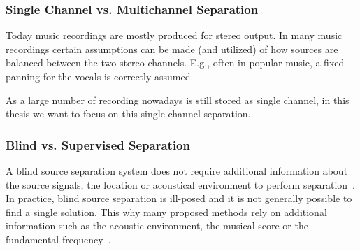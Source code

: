 \subsubsection*{Single Channel vs. Multichannel Separation}
Today music recordings are mostly produced for stereo output. 
In many music recordings certain assumptions can be made (and utilized) of how sources are balanced between the two stereo channels. 
E.g., often in popular music, a fixed panning for the vocals is correctly assumed.
\par
As a large number of recording nowadays is still stored as single channel, in this thesis we want to focus on this single channel separation.

\subsubsection*{Blind vs. Supervised Separation}
A blind source separation system does not require additional information about the source signals, the location or acoustical environment to perform separation~\cite{makino07}.
In practice, blind source separation is ill-posed and it is not generally possible to find a single solution.
This why many proposed methods rely on additional information such as the acoustic environment, the musical score or the fundamental frequency~\cite{liutkus13, ewert14}.

